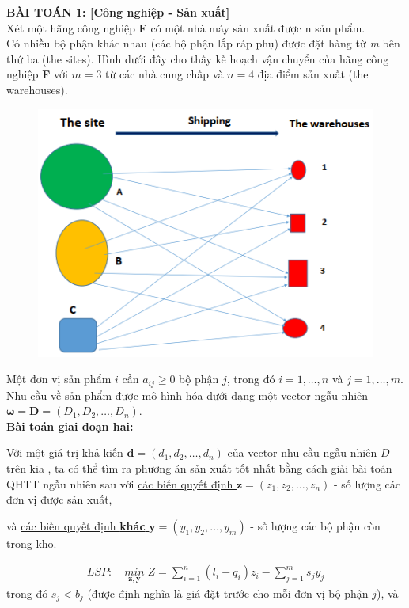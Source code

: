 \documentclass[a4paper]{article}
\begin{document}
    \textbf{BÀI TOÁN 1: [Công nghiệp - Sản xuất]}\\
    Xét một hãng công nghiệp \textbf{F} có một nhà máy sản xuất được n sản phẩm.\\
    Có nhiều bộ phận khác nhau (các bộ phận lắp ráp phụ) được đặt hàng từ \textit{m} bên thứ ba (the sites).
    Hình dưới đây cho thấy kế hoạch vận chuyển của hãng công nghiệp \textbf{F} với $m=3$ từ các nhà cung chấp
    và $n=4$ địa điểm sản xuất (the warehouses).
    \begin{figure}[ht]
        \centering
        \includegraphics{hinh3.png}
    \end{figure}

    Một đơn vị sản phẩm $i$ cần $a_{ij} \geq 0$ bộ phận $j$, trong đó $i=1, \dots , n$ và $j = 1, \dots , m$.
    Nhu cầu về sản phẩm được mô hình hóa dưới dạng một vector ngẫu nhiên $\boldsymbol{\omega}=\boldsymbol{D}=(D_1,D_2, \dots , D_n)$.\\
    
    \textbf{Bài toán giai đoạn hai:}

    Với một giá trị khả kiến $\boldsymbol{d}=(d_1,d_2, \dots, d_n)$ của vector nhu cầu ngẫu nhiên $D$trên kia 
    , ta có thể tìm ra phương án sản xuất tốt nhất bằng cách giải bài toán QHTT ngẫu nhiên sau với
    \underline{các biến quyết định $\boldsymbol{z}=(z_1, z_2, \dots, z_n)$} - số lượng các đơn vị được sản xuất,

    và \underline{các biến quyết định \textbf{khác} $\boldsymbol{y}=(y_1, y_2, \dots, y_m)$} - số lượng các bộ phận còn trong kho.

    \begin{gather}
        LSP: \quad \underset{\boldsymbol{z, y}}{min} \; Z= \sum_{i=1}^{n} (l_i - q_i)z_i - \sum_{j=1}^{m}s_j y_j
    \end{gather}
    trong đó $s_j < b_j$ (được định nghĩa là giá đặt trước cho mỗi đơn vị bộ phận $j$), và
\end{document}
